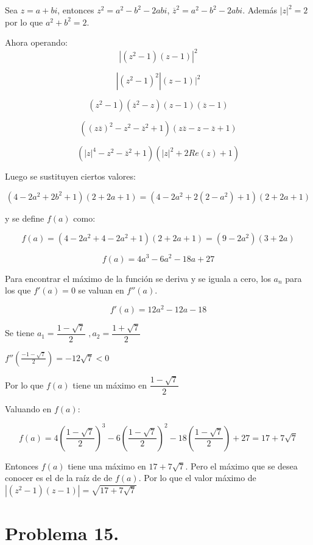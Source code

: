 \documentclass[11pt]{article}
\theoremstyle{Tema} \newtheorem{Tema}{Tema} %
\theoremstyle{Tema} \newtheorem{serie}{Serie}              %
\theoremstyle{Tema} \newtheorem{ejercicio}{Ejercicio}    %
\begin{document}
\begin{exercise}
Sea $ z=a+bi $, entonces $ z^2=a^2-b^2-2abi $, $ \overline{z}^2=a^2-b^2-2abi $. Adem\'as $ |z|^2=2 $
por lo que $ a^2+b^2=2 $.

Ahora operando:
\begin{equation*}
|(z^2-1)(z-1)|^2
\end{equation*}

\begin{equation*}
|(z^2-1)^2|(z-1)|^2
\end{equation*}

\begin{equation*}
(z^2-1)(\overline{z}^2-z)(z-1)(\overline{z}-1)
\end{equation*}

\begin{equation*}
((z\overline{z})^2-z^2-\overline{z}^2+1)(z\overline{z}-z-\overline{z}+1)
\end{equation*}

\begin{equation*}
(|z|^4-z^2-\overline{z}^2+1)(|z|^2+2Re(z)+1)
\end{equation*}

Luego se sustituyen ciertos valores:

\begin{equation*}
(4-2a^2+2b^2+1)(2+2a+1)=(4-2a^2+2(2-a^2)+1)(2+2a+1)
\end{equation*}


 y se define $f(a)$ como:


\begin{equation*}
f(a)=(4-2a^2+4-2a^2+1)(2+2a+1)=(9-2a^2)(3+2a)
\end{equation*}


\begin{equation*}
f(a)=4a^3-6a^2-18a+27
\end{equation*}

Para encontrar el m\'aximo de la funci\'on se deriva y  se iguala a cero, los $ a_n $ para los que $ f'(a)=0 $ se valuan en $ f''(a) $.

\begin{equation*}
f'(a)= 12a^2-12a-18
\end{equation*}

Se tiene $ a_1=\dfrac{1-\sqrt{7}}{2}$  $, a_2=\dfrac{1+\sqrt{7}}{2}$


$ f''\left(\frac{-1-\sqrt{7}}{2}\right) =-12\sqrt{7}<0$

Por lo que $ f(a) $ tiene un m\'aximo en $ \dfrac{1-\sqrt7}{2} $

Valuando en $ f(a) $:


\begin{equation*}
f(a)=4\left(\dfrac{1-\sqrt7}{2}\right)^3-6\left(\dfrac{1-\sqrt7}{2}\right)^2-18\left(\dfrac{1-\sqrt7}{2}\right)+27=17+7\sqrt{7}
\end{equation*}

Entonces $ f(a) $ tiene una m\'aximo en $ 17+7\sqrt{7} $. Pero el m\'aximo que se desea conocer es el de la ra\'iz de de $ f(a) $. Por lo que el valor m\'aximo de $  |(z^2-1)(z-1)|=\sqrt{17+7\sqrt{7}}$

\end{exercise}
\section*{\textbf{Problema 15.} }


\vspace{0.05 in}
\end{document}
